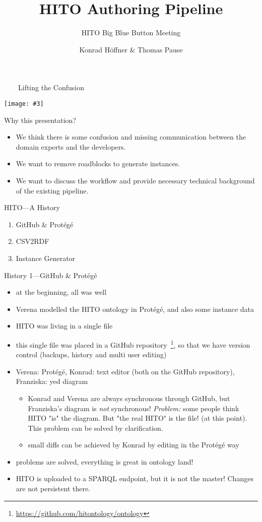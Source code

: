 \documentclass[aspectratio=1610]{beamer}
\title{HITO Authoring Pipeline}
\subtitle{HITO Big Blue Button Meeting}
\author{Konrad Höffner \& Thomas Pause}
\newcommand{\imageslide}[4][]
{
\begin{frame}[plain]{~~~~#2}
\vspace{0.2em}
\begin{center}
\centering\texttt{[image: \#3]}
\end{center}
#1
\note{#4}
\end{frame}
}
\begin{document}
\begin{frame}
\titlepage
\end{frame}

\imageslide{Lifting the Confusion}{confusion.pdf}{}

\begin{frame}{Why this presentation?}
\begin{itemize}
\item We think there is some confusion and missing communication between the domain experts and the developers.
\item We want to remove roadblocks to generate instances.
\item We want to discuss the workflow and provide necessary technical background of the existing pipeline.
\end{itemize}
\end{frame}

\begin{frame}{HITO---A History}
\begin{enumerate}
\item GitHub \& Protégé
\item CSV2RDF
\item Instance Generator
\end{enumerate}
\end{frame}

\begin{frame}{History 1---GitHub \& Protégé}
\begin{itemize}
  \item at the beginning, all was well
  \item Verena modelled the HITO ontology in Protégé, and also some instance data
  \item HITO was living in a single file
  \item this single file was placed in a GitHub repository~\footnote{\url{https://github.com/hitontology/ontology}}, so that we have version control (backups, history and multi user editing)
  \item Verena: Protégé, Konrad: text editor (both on the GitHub repository), Franziska: yed diagram
\begin{itemize}
  \item Konrad and Verena are always synchronous through GitHub, but Franziska's diagram is \emph{not} synchronous! \emph{Problem:} some people think HITO "is" the diagram. But "the real HITO" is the file! (at this point). This problem can be solved by clarification.
  \item small diffs can be achieved by Konrad by editing in the Protégé way
\end{itemize}
  \item problems are solved, everything is great in ontology land!
  \item HITO is uploaded to a SPARQL endpoint, but it is not the master! Changes are not persistent there.
\end{itemize}
\end{frame}
\end{document}
